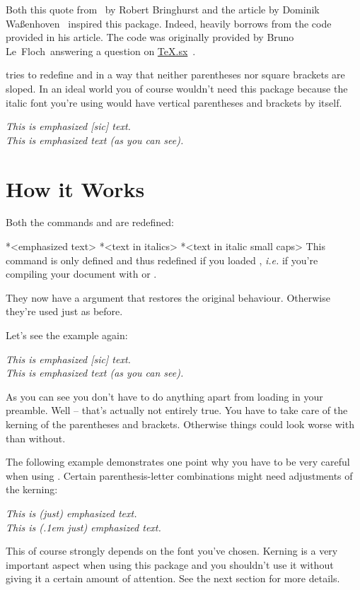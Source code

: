 \documentclass[DIV10,toc=index,toc=bib]{cnpkgdoc}
\begin{document}
\noindent
Both this quote from~ by Robert Bringhurst and the
article  by Dominik Waßenhoven~\cite{dtk12-dw} inspired
this package. Indeed, \embrac heavily borrows from the code \citeauthor{dtk12-dw}
provided in his article\manythanks. The code was originally provided by Bruno
Le~Floch\manythanks\ answering a question on
\href{http://tex.stackexchange.com}{TeX.sx}~\cite{lefloch11}.

\embrac tries to redefine  and  in a way that neither
parentheses nor square brackets are sloped. In an ideal world you of course
wouldn't need this package because the italic font you're using would have
vertical parentheses and brackets by itself.

\begin{beispiel}
 \emph{This is emphasized [sic] text.} \\
 \emph{This is emphasized text (as you can see).}
\end{beispiel}

\section{How it Works}
Both the commands  and  are redefined:
\begin{beschreibung}
 *{<emphasized text>}
 *{<text in italics>}
 *{<text in italic small caps>}\newline
   This command is only defined and thus redefined if you loaded ,
   \emph{i.e.} if you're compiling your document with \XeLaTeX{} or \LuaLaTeX.
\end{beschreibung}
They now have a \code{*} argument that restores the original behaviour.
Otherwise they're used just as before.

Let's see the example again:
\begin{beispiel}
 \emph{This is emphasized [sic] text.} \\
 \emph{This is emphasized text (as you can see).}
\end{beispiel}
As you can see you don't have to do anything apart from loading \embrac in your
preamble. Well -- that's actually not entirely true. You have to take care of the
kerning of the parentheses and brackets. Otherwise things could look worse with
\embrac than without.

The following example demonstrates one point why you have to be very careful
when using \embrac. Certain parenthesis-letter combinations might need adjustments
of the kerning:
\begin{beispiel}
 \emph{This is (just) emphasized text.} \\
 \emph{This is (\kern.1em just) emphasized text.}
\end{beispiel}
This of course strongly depends on the font you've chosen. Kerning is a very
important aspect when using this package and you shouldn't use it without giving
it a certain amount of attention. See the next section for more details.
\end{document}
